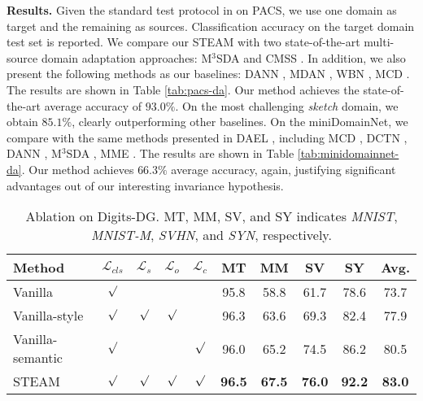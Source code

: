 \documentclass[10pt,twocolumn,letterpaper]{article}
\newcommand{\0}{{\bf 0}}
\begin{document}
\textbf{Results.} Given the standard test protocol in \cite{peng2019moment} on PACS, we use one domain as target and the remaining as sources. Classification accuracy on the target domain test set is reported. We compare our STEAM with two state-of-the-art multi-source domain adaptation approaches: M$^3$SDA \cite{peng2019moment} and CMSS \cite{yang2020curriculum}. In addition, we also present the following methods as our baselines: DANN \cite{ganin2015unsupervised}, MDAN \cite{zhao2018adversarial}, WBN \cite{mancini2018boosting}, MCD \cite{saito2018maximum}. The results are shown in Table \ref{tab:pacs-da}. Our method achieves the state-of-the-art average accuracy of $93.0\%$. On the most challenging \textit{sketch} domain, we obtain $85.1\%$, clearly outperforming other baselines. On the miniDomainNet, we compare with the same methods presented in DAEL \cite{zhou2020domain}, including MCD \cite{saito2018maximum}, DCTN \cite{xu2018deep}, DANN \cite{ganin2015unsupervised}, M$^3$SDA \cite{peng2019moment}, MME \cite{saito2019semi}. The results are shown in Table \ref{tab:minidomainnet-da}. Our method achieves $66.3\%$ average accuracy, again, justifying significant advantages out of our interesting invariance hypothesis.

\begin{table}[t]
\center
\scriptsize
\setlength{\tabcolsep}{4pt}
\renewcommand{\arraystretch}{1.4}
\caption{Ablation on Digits-DG. MT, MM, SV, and SY indicates \textit{MNIST}, \textit{MNIST-M}, \textit{SVHN}, and \textit{SYN}, respectively.}
\vspace{0.2cm}
\begin{tabular}{l | c c c c  |c c c c | c}
\hline

Method &$\mathcal{L}_{cls}$ &$\mathcal{L}_{s}$ &$\mathcal{L}_{o}$ &$\mathcal{L}_{c}$ & MT & MM & SV & SY & Avg. \\ \hline
Vanilla &$\surd$ &~ &~ &~ & 95.8 & 58.8 & 61.7 & 78.6 & 73.7 \\
Vanilla-style &$\surd$ &$\surd$ &$\surd$ &~ & 96.3 & 63.6 & 69.3 & 82.4 & 77.9 \\
Vanilla-semantic &$\surd$ &~ &~ &$\surd$ & 96.0 & 65.2 & 74.5 & 86.2 & 80.5 \\
\hline
STEAM &$\surd$ &$\surd$ &$\surd$ &$\surd$ & \textbf{96.5} & \textbf{67.5} & \textbf{76.0} & \textbf{92.2} & \textbf{83.0} \\
\hline
\end{tabular}
\vspace{-0.18in}
\label{tab:ablation-digits-dg}
\end{table}
\end{document}
